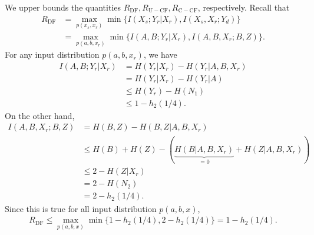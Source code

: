 \documentclass[12pt]{article}
\theoremstyle{definition}
\begin{document}
We upper bounds the quantities $R_{\mathrm{DF}}, R_{\mathrm{U-CF}}, R_{\mathrm{C-CF}}$, respectively. Recall that 
\begin{align*}
    R_{\mathrm{DF}} & = \max_{p(x_s, x_r)} \min\{I(X_s; Y_r | X_r), I(X_s, X_r; Y_d)\} \\
    & = \max_{p(a,b,x_r)} \min\{I(A,B; Y_r| X_r), I(A, B, X_r; B, Z)\}.
\end{align*}
For any input distribution $p(a,b,x_r)$, we have
\begin{align*}
    I(A, B; Y_r |X_r) & = H(Y_r |X_r) - H(Y_r | A, B, X_r) \\
    & = H(Y_r | X_r) - H(Y_r | A) \\
    & \leq H(Y_r) - H(N_1) \\
    & \leq 1 - h_2(1/4).
\end{align*}
On the other hand,
\begin{align*}
    I(A, B, X_r; B, Z) & = H(B, Z) - H(B, Z| A,B, X_r) \\
    & \leq H(B) + H(Z) - \left( \underbrace{H(B|A,B, X_r)}_{= 0} +  H(Z|A,B,X_r)\right) \\
    & \leq 2 - H(Z|X_r) \\
    & = 2 - H(N_2) \\
    & = 2 - h_2(1/4).
\end{align*}
Since this is true for all input distribution $p(a,b,x)$,
\begin{align*}
    R_{\mathrm{DF}} \leq \max_{p(a,b,x)} \min\{1-h_2(1/4), 2-h_2(1/4)\} = 1 -h_2(1/4).
\end{align*}
\end{document}
